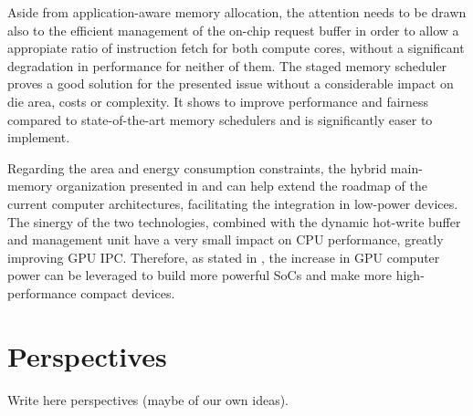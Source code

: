 \documentclass[12pt,journal,compsoc]{IEEEtran}
\begin{document}
Aside from application-aware memory allocation, the attention needs to be drawn also to the efficient management of the on-chip request buffer in order to allow a appropiate ratio of instruction fetch for both compute cores, without a significant degradation in performance for neither of them. The  staged memory scheduler proves a good solution for the presented issue without a considerable impact on die area, costs or complexity.  It shows to improve performance and fairness compared to state-of-the-art memory schedulers and is significantly easer to implement\cite{SmS}.

Regarding the area and energy consumption constraints, the hybrid main-memory organization presented in \cite{PRAM} and \cite{PDRAM} can help extend the roadmap of the current computer architectures, facilitating the integration in low-power devices. The sinergy of the two technologies, combined with the dynamic hot-write buffer and management unit have a very small impact on CPU performance, greatly improving GPU IPC. Therefore, as stated in \cite{PRAM}, the increase in GPU computer power can be leveraged to build more powerful SoCs and make more high-performance compact devices.

\section{Perspectives}
Write here perspectives (maybe of our own ideas). 

\ifCLASSOPTIONcompsoc

\ifCLASSOPTIONcaptionsoff
  \newpage
\fi





\newpage

\end{document}
